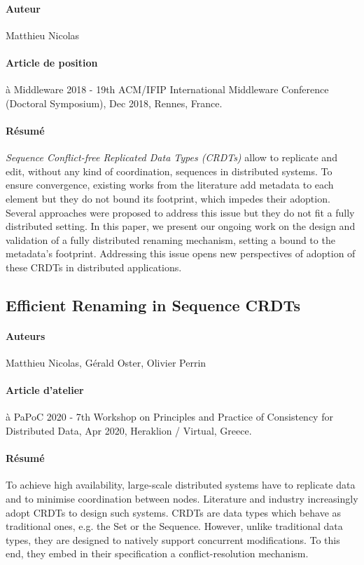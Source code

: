 \paragraph{Auteur} Matthieu Nicolas

\paragraph{Article de position} à Middleware 2018 - 19th ACM/IFIP International Middleware Conference (Doctoral Symposium), Dec 2018, Rennes, France.

\paragraph{Résumé}
\emph{Sequence Conflict-free Replicated Data Types (CRDTs)} allow to replicate and edit, without any kind of coordination, sequences in distributed systems.
To ensure convergence, existing works from the literature add metadata to each element but they do not bound its footprint, which impedes their adoption.
Several approaches were proposed to address this issue but they do not fit a fully distributed setting.
In this paper, we present our ongoing work on the design and validation of a fully distributed renaming mechanism, setting a bound to the metadata's footprint.
Addressing this issue opens new perspectives of adoption of these CRDTs in distributed applications.

\subsection*{Efficient Renaming in Sequence CRDTs \cite{2020-rls-papoc-nicolas}}

\paragraph{Auteurs} Matthieu Nicolas, Gérald Oster, Olivier Perrin

\paragraph{Article d'atelier} à PaPoC 2020 - 7th Workshop on Principles and Practice of Consistency for Distributed Data, Apr 2020, Heraklion / Virtual, Greece.

\paragraph{Résumé}
To achieve high availability, large-scale distributed systems have to replicate data and to minimise coordination between nodes.
Literature and industry increasingly adopt \acfp{CRDT} to design such systems.
\acp{CRDT} are data types which behave as traditional ones, e.g. the Set or the Sequence.
However, unlike traditional data types, they are designed to natively support concurrent modifications.
To this end, they embed in their specification a conflict-resolution mechanism.

